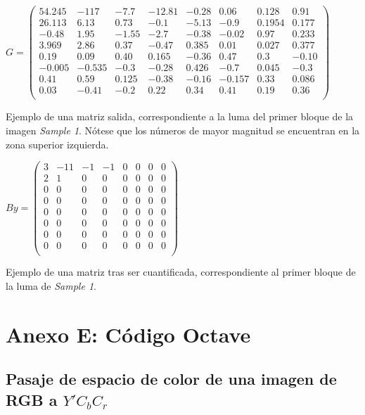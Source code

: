 \documentclass[%
final,
%
reprint,
%
notitlepage,
narroweqnarray,
inline,
twoside,
invited
]{ieee}
\begin{document}
\( G = 
\begin{pmatrix}

54.245 & -117 & -7.7 & -12.81 & -0.28 & 0.06 & 0.128 & 0.91 \\
26.113 & 6.13 & 0.73 & -0.1 & -5.13 & -0.9 & 0.1954 & 0.177 \\
-0.48 & 1.95 & -1.55 & -2.7 & -0.38 & -0.02 & 0.97 & 0.233 \\ 
3.969 & 2.86 & 0.37 & -0.47 & 0.385 & 0.01 & 0.027 & 0.377 \\ 
0.19 & 0.09 & 0.40 & 0.165 & -0.36 & 0.47 & 0.3 & -0.10 \\
-0.005 & -0.535 & -0.3 & -0.28 & 0.426 & -0.7 & 0.045 & -0.3 \\
0.41 & 0.59 & 0.125 & -0.38 & -0.16 & -0.157 & 0.33 & 0.086 \\
0.03 & -0.41 & -0.2 & 0.22 & 0.34 & 0.41 & 0.19 & 0.36 \\
\end{pmatrix}\)
\begin{center}
Ejemplo de una matriz salida, correspondiente a la luma del primer bloque de la imagen \textit{Sample 1}. Nótese 
que los números de mayor magnitud se encuentran en la zona superior izquierda.
\end{center}

\( By = 
\begin{pmatrix}
3 & -11 & -1 & -1 & 0 & 0 & 0 & 0 \\
2 & 1 & 0 & 0 & 0 & 0 & 0 & 0 \\
0 & 0 & 0 & 0 & 0 & 0 & 0 & 0 \\ 
0 & 0 & 0 & 0 & 0 & 0 & 0 & 0 \\ 
0 & 0 & 0 & 0 & 0 & 0 & 0 & 0 \\
0 & 0 & 0 & 0 & 0 & 0 & 0 & 0  \\ 
0 & 0 & 0 & 0 & 0 & 0 & 0 & 0 \\
0 & 0 & 0 & 0 & 0 & 0 & 0 & 0 \\ 
\end{pmatrix}\)

\begin{center} Ejemplo de una matriz tras ser cuantificada, correspondiente al primer bloque de la luma de \textit{Sample 1}.
\end{center}

\section*{Anexo E: Código Octave}

\subsection{Pasaje de espacio de color de una imagen de RGB a $Y'C_bC_r$}
\end{document}
